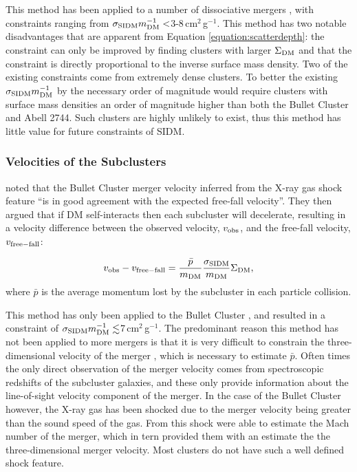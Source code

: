 This method has been applied to a number of dissociative mergers \citep{Markevitch:2004dl, Dawson:2012dl, Merten:2011gu}, with constraints ranging from $\sigma_{\rm SIDM}m^{-1}_{\rm DM} <$3-8\,cm$^2$\,g$^{-1}$.
This method has two notable disadvantages that are apparent from Equation \ref{equation:scatterdepth}: the constraint can only be improved by finding clusters with larger $\Sigma_{\rm DM}$ and that the constraint is directly proportional to the inverse surface mass density.
Two of the existing constraints \citep{Markevitch:2004dl, Merten:2011gu} come from extremely dense clusters.
To better the existing $\sigma_{\rm SIDM}m^{-1}_{\rm DM}$ by the necessary order of magnitude would require clusters with surface mass densities an order of magnitude higher than both the Bullet Cluster and Abell 2744.
Such clusters are highly unlikely to exist, thus this method has little value for future constraints of SIDM.
 
\subsubsection{Velocities of the Subclusters} 
 
\citet{Markevitch:2004dl} noted that the Bullet Cluster merger velocity inferred from the X-ray gas shock feature ``is in good agreement with the expected free-fall velocity''.
They then argued that if DM self-interacts then each subcluster will decelerate, resulting in a velocity difference between the observed velocity, $v_{\rm obs}$, and the free-fall velocity, $v_{\rm free-fall}$:

\begin{displaymath}
v_{\rm obs} - v_{\rm free-fall} = \frac{\bar{p}}{m_{\rm DM}}\frac{\sigma_{\rm SIDM}}{m_{\rm DM}} \Sigma_{\rm DM},
\end{displaymath}
where $\bar{p}$ is the average momentum lost by the subcluster in each particle collision.

This method has only been applied to the Bullet Cluster \citep{Markevitch:2004dl}, and resulted in a constraint of $\sigma_{\rm SIDM}m^{-1}_{\rm DM} \lesssim$7\,cm$^2$\,g$^{-1}$.
The predominant reason this method has not been applied to more mergers is that it is very difficult to constrain the three-dimensional velocity of the merger \citep{Dawson:2012ub}, which is necessary to estimate $\bar{p}$.
Often times the only direct observation of the merger velocity comes from spectroscopic redshifts of the subcluster galaxies, and these only provide information about the line-of-sight velocity component of the merger.
In the case of the Bullet Cluster however, the X-ray gas has been shocked due to the merger velocity being greater than the sound speed of the gas.
From this shock \citet{Markevitch:2002iz} were able to estimate the Mach number of the merger, which in tern provided them with an estimate the the three-dimensional merger velocity.
Most clusters do not have such a well defined shock feature.

